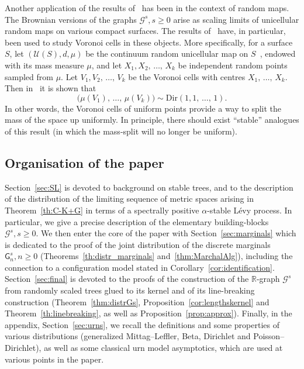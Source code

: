 \documentclass[10pt]{amsart}
\theoremstyle{definition}\newtheorem{defi}[theo]{Definition}\newtheorem{rema}[theo]{Remark}\newtheorem{exam}[theo]{Example}\newtheorem{exem}[theo]{Example}\newtheorem{nota}[theo]{Notation}
\newcommand{\Dir}{\mathrm{Dir}}
\newcommand{\cG}{\mathcal{G}}
\newcommand{\cU}{\mathcal{U}}
\newcommand{\sG}{\mathsf{G}}
\newcommand{\R}{\mathbb{R}}
\begin{document}
Another application of the results of~\cite{ABBrGo} has been in the context of random maps. The Brownian versions of the graphs $\cG^s, s \ge 0$ arise as scaling limits of unicellular random maps on various compact surfaces. The results of~\cite{ABBrGo} have, in particular, been used to study Voronoi cells in these objects. More specifically, for a surface $S$, let $(\cU(S), d, \mu)$ be the continuum random unicellular map on $S$~\cite{ABACFG}, endowed with its mass measure $\mu$, and let $X_1, X_2,\,\ldots,\, X_k$ be independent random points sampled from $\mu$. Let $V_1, V_2,\,\ldots,\, V_k$ be the Voronoi cells with centres $X_1,\, \ldots,\, X_k$. Then in~\cite{ABACFG} it is shown that
\[
\big(\mu(V_1),\, \ldots,\, \mu(V_k)\big) \sim \Dir(1,1,\,\ldots,\,1).
\]
In other words, the Voronoi cells of uniform points provide a way to split the mass of the space up uniformly. In principle, there should exist ``stable'' analogues of this result (in which the mass-split will no longer be uniform).

\subsection{Organisation of the paper}

Section~\ref{sec:SL} is devoted to background on stable trees, and to the description of the distribution of the limiting sequence of metric spaces arising in Theorem~\ref{th:C-K+G} in terms of a spectrally positive $\alpha$-stable Lévy process. In particular, we give a precise description of the elementary building-blocks $\cG^s, s \geq 0$. We then enter the core of the paper with Section~\ref{sec:marginals} which is dedicated to the proof of the joint distribution of the discrete marginals $\sG_n^s, n \geq 0$ (Theorems~\ref{th:distr_marginals} and~\ref{thm:MarchalAlg}), including the connection to a configuration model stated in Corollary~\ref{cor:identification}. Section~\ref{sec:final} is devoted to the proofs of the construction of the $\R$-graph $\cG^s$ from randomly scaled trees glued to its kernel and of its line-breaking construction (Theorem~\ref{thm:distrGs}, Proposition~\ref{cor:lengthskernel} and Theorem~\ref{th:linebreaking}, as well as Proposition~\ref{prop:approx}). Finally, in the appendix, Section~\ref{sec:urns}, we recall the definitions and some properties of various distributions (generalized Mittag--Leffler, Beta, Dirichlet and Poisson--Dirichlet), as well as some classical urn model asymptotics, which are used at various points in the paper.
\end{document}
